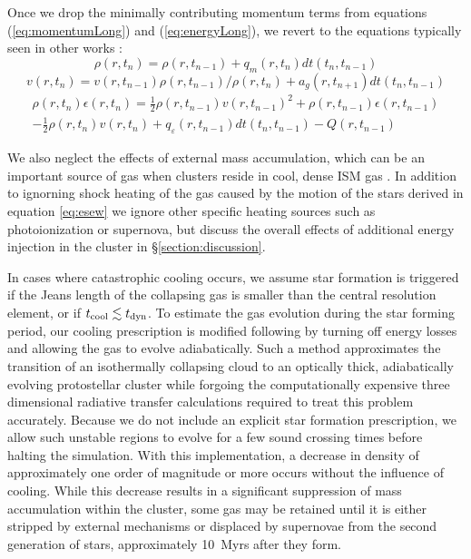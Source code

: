 \documentclass[fleqn,usenatbib]{mnras}
\begin{document}
 Once we drop the minimally contributing momentum terms from equations (\ref{eq:momentumLong}) and (\ref{eq:energyLong}), we revert to the equations typically seen in other works \citep{priestley2011,hue2010}:
\begin{equation}
\rho(r,t_n) = \rho(r,t_{n-1}) + q_{m}(r,t_{n}) dt(t_n,t_{n-1})
\label{eq:masscons}
\end{equation}
%
\begin{equation}
v(r,t_{n}) = v(r,t_{n-1}) \rho(r,t_{n-1})/\rho(r,t_{n}) + a_g(r,t_{n+1})dt(t_n,t_{n-1})
\label{eq:momentum}
\end{equation}
%
\begin{equation}
\begin{multlined}
\rho(r,t_n)\epsilon(r,t_n) = \frac{1}{2}\rho(r,t_{n-1})v(r,t_{n-1})^2 + \rho(r,t_{n-1})\epsilon(r,t_{n-1}) \\
- \frac{1}{2}\rho(r,t_{n})v(r,t_{n})+ q_\varepsilon(r,t_{n-1})dt(t_n,t_{n-1})-Q(r,t_{n-1})
\label{eq:energy}
\end{multlined}
\end{equation}



 We also neglect the effects of external mass accumulation, which can be an important source of gas when 
clusters reside in cool, dense ISM gas \citep{naiman2009,naiman2011,priestley2011,conroy2012}.
In addition to ignorning shock heating of the gas caused by  the motion of the stars derived in equation \ref{eq:esew} we ignore other specific heating sources such as photoionization or  supernova, but discuss the overall effects of additional energy injection in the cluster in  \S\ref{section:discussion}.  

 In cases where catastrophic cooling occurs, we assume star formation is triggered if the Jeans length of the collapsing gas is smaller than the 
central resolution element, or if $t_{\rm cool} \lesssim t_{\rm dyn}$.  To estimate the gas evolution during the star forming period, our cooling prescription is modified following \citet{truelove1997}  by turning off  energy losses  and allowing the gas to evolve adiabatically.  
Such a method approximates the transition of an isothermally collapsing cloud to an optically thick, adiabatically 
evolving protostellar cluster while forgoing the computationally expensive three dimensional radiative transfer calculations 
required to treat this problem accurately.
 Because we do not include an explicit star formation prescription, we allow such unstable regions to evolve  for  a few sound crossing times 
before halting the simulation.  With this implementation, a decrease in density of approximately one order of magnitude or more occurs without the influence of cooling.  While this decrease results in a significant suppression of mass accumulation within the cluster, some gas may be retained until it is either stripped by external mechanisms or displaced by supernovae from the second generation of stars, approximately 10~Myrs after they form.\\
\\
\end{document}
